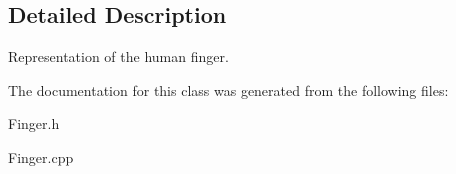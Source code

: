 \subsection{Detailed Description}
Representation of the human finger. 

The documentation for this class was generated from the following files\+:\begin{DoxyCompactItemize}
\item 
Finger.\+h\item 
Finger.\+cpp\end{DoxyCompactItemize}
